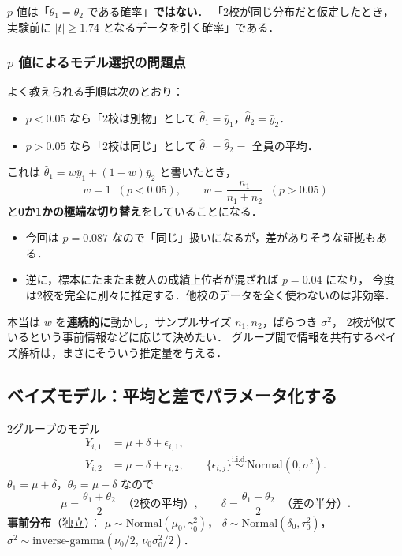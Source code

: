 \documentclass[lualatex,ja=standard,a4paper,12pt]{bxjsarticle}
\newcommand{\IG}{\mathrm{inverse\text{-}gamma}}
\begin{document}
\begin{warningbox}
$p$ 値は「$\theta_1 = \theta_2$ である確率」\textbf{ではない}．
「2校が同じ分布だと仮定したとき，実験前に $|t| \ge 1.74$ となるデータを引く確率」である．
\end{warningbox}

\subsubsection*{$p$ 値によるモデル選択の問題点}

よく教えられる手順は次のとおり：
\begin{itemize}
  \item $p < 0.05$ なら「2校は別物」として $\hat{\theta}_1 = \bar{y}_1$，$\hat{\theta}_2 = \bar{y}_2$．
  \item $p > 0.05$ なら「2校は同じ」として $\hat{\theta}_1 = \hat{\theta}_2 = $ 全員の平均．
\end{itemize}

これは $\hat{\theta}_1 = w\bar{y}_1 + (1-w)\bar{y}_2$ と書いたとき，
\[
  w = 1 \;\;(p < 0.05), \qquad w = \frac{n_1}{n_1 + n_2} \;\;(p > 0.05)
\]
と\textbf{0か1かの極端な切り替え}をしていることになる．

\begin{itemize}
  \item 今回は $p = 0.087$ なので「同じ」扱いになるが，差がありそうな証拠もある．
  \item 逆に，標本にたまたま数人の成績上位者が混ざれば $p = 0.04$ になり，
        今度は2校を完全に別々に推定する．他校のデータを全く使わないのは非効率．
\end{itemize}

\begin{pointbox}
本当は $w$ を\textbf{連続的に}動かし，サンプルサイズ $n_1, n_2$，ばらつき $\sigma^2$，
2校が似ているという事前情報などに応じて決めたい．
グループ間で情報を共有するベイズ解析は，まさにそういう推定量を与える．
\end{pointbox}

\subsection{ベイズモデル：平均と差でパラメータ化する}

\begin{defbox}{2グループのモデル}
\begin{align*}
  Y_{i,1} &= \mu + \delta + \epsilon_{i,1}, \\
  Y_{i,2} &= \mu - \delta + \epsilon_{i,2}, \qquad
  \{\epsilon_{i,j}\} \overset{\text{i.i.d.}}{\sim} \mathrm{Normal}(0, \sigma^2).
\end{align*}
$\theta_1 = \mu + \delta$，$\theta_2 = \mu - \delta$ なので
\[
  \mu = \frac{\theta_1 + \theta_2}{2} \;\;\text{（2校の平均）}, \qquad
  \delta = \frac{\theta_1 - \theta_2}{2} \;\;\text{（差の半分）}.
\]
\textbf{事前分布}（独立）：
$\mu \sim \mathrm{Normal}(\mu_0, \gamma_0^2)$，
$\delta \sim \mathrm{Normal}(\delta_0, \tau_0^2)$，
$\sigma^2 \sim \IG(\nu_0/2,\, \nu_0\sigma_0^2/2)$．
\end{defbox}
\end{document}
